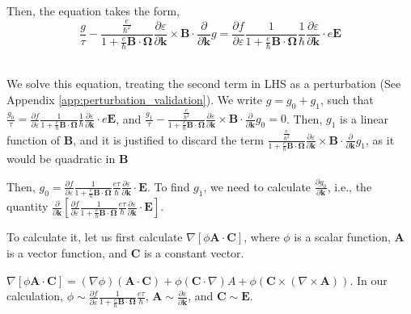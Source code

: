 \documentclass{revtex4-2}
\newcommand{\bvec}[1]{{\mathbf #1}}
\begin{document}
Then, the equation takes the form,
\begin{equation}
\frac{g}{\tau} -\frac{\frac{e}{\hbar^2} }{1 + \frac{e}{\hbar} \bvec{B}\cdot\bvec{\Omega}} \frac{\partial \varepsilon}{\partial \bvec{k}} \times \bvec{B} \cdot\frac{\partial}{\partial \bvec{k}} g = \frac{\partial f}{\partial \varepsilon}\frac{1}{1 + \frac{e}{\hbar} \bvec{B}\cdot\bvec{\Omega}}
\frac{1}{\hbar} \frac{\partial \varepsilon}{\partial \bvec{k}}\cdot e \bvec{E}
\end{equation}~\label{Eq:BTE_zero_chem_pot_thermal_gradient}

We solve this equation, treating the second term in LHS as a perturbation (See Appendix \ref{app:perturbation_validation}).
We write $g = g_0 + g_1$, such that $\frac{g_0}{\tau} = \frac{\partial f}{\partial \varepsilon}\frac{1}{1 + \frac{e}{\hbar} \bvec{B}\cdot\bvec{\Omega}}
\frac{1}{\hbar} \frac{\partial \varepsilon}{\partial \bvec{k}}\cdot e \bvec{E}$, and $\frac{g_1}{\tau} -\frac{\frac{e}{\hbar^2} }{1 + \frac{e}{\hbar} \bvec{B}\cdot\bvec{\Omega}} \frac{\partial \varepsilon}{\partial \bvec{k}} \times \bvec{B} \cdot\frac{\partial}{\partial \bvec{k}} g_0 = 0$.
Then, $g_1$ is a linear function of $\bvec{B}$, and it is justified to discard the term $\frac{\frac{e}{\hbar^2} }{1 + \frac{e}{\hbar} \bvec{B}\cdot\bvec{\Omega}} \frac{\partial \varepsilon}{\partial \bvec{k}} \times \bvec{B} \cdot\frac{\partial}{\partial \bvec{k}} g_1$, as it would be quadratic in $\bvec{B}$


Then, ${g_0} = \frac{\partial f} {\partial \varepsilon}\frac{1}{1 + \frac{e}{\hbar} \bvec{B}\cdot\bvec{\Omega}}
\frac{e \tau}{\hbar} \frac{\partial \varepsilon}{\partial \bvec{k}}\cdot \bvec{E}$. To find $g_1$, we need to calculate $\frac{\partial g_0}{\partial \bvec{k}}$, i.e., the quantity 
$\frac{\partial}{\partial \bvec{k}} \left[ \frac{\partial f} {\partial \varepsilon}\frac{1}{1 + \frac{e}{\hbar} \bvec{B}\cdot\bvec{\Omega}}
\frac{e \tau}{\hbar} \frac{\partial \varepsilon}{\partial \bvec{k}}\cdot \bvec{E} \right]$.

To calculate it, let us first calculate $\nabla \left[\phi \bvec{A}\cdot\bvec{C}\right]$, where $\phi$ is a scalar function, $\bvec{A}$ is a vector function, and $\bvec{C}$ is a constant vector.

$\nabla \left[\phi \bvec{A}\cdot\bvec{C}\right] = (\nabla \phi) (\bvec{A}\cdot\bvec{C}) + \phi (\bvec{C}\cdot \nabla){A} + \phi (\bvec{C}\times(\nabla\times\bvec{A})) $. In our calculation, $\phi \sim \frac{\partial f} {\partial \varepsilon}\frac{1}{1 + \frac{e}{\hbar} \bvec{B}\cdot\bvec{\Omega}}
\frac{e \tau}{\hbar}$, $\bvec{A} \sim \frac{\partial \varepsilon}{\partial \bvec{k}}$, and $\bvec{C} \sim \bvec{E}$.
\end{document}

